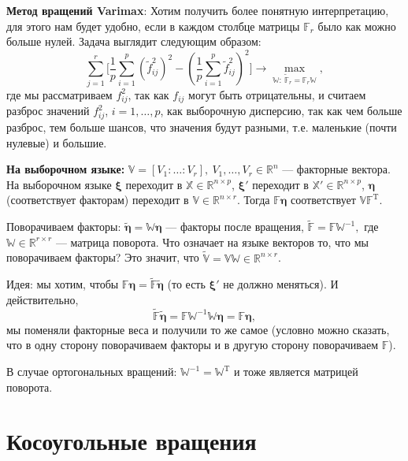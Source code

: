 \documentclass[specialist, 12pt,
subf, %
href, colorlinks=true,
substylefile = spbu.rtx,
]{disser}
\begin{document}
\textbf{Метод вращений Varimax}:
Хотим получить более понятную интерпретацию, для этого нам будет удобно, если в каждом столбце матрицы $\mathbb{F}_r$ было как можно больше нулей. Задача выглядит следующим образом:
\begin{equation*}
\sum\limits_{j=1}^r \big[\frac{1}{p}\sum\limits_{i=1}^p(\widetilde{f}_{ij}^2)^2-(\frac{1}{p}\sum\limits_{i=1}^p\widetilde{f}_{ij}^2)^2\big] \to \max\limits_{\mathbb{W}:~ \widetilde{\mathbb{F}}_r=\mathbb{F}_r\mathbb{W} },
\end{equation*}
где мы рассматриваем $f_{ij}^2$, так как $f_{ij}$ могут быть отрицательны, и считаем разброс значений $f_{ij}^2$, $i=1,\ldots,p$, как выборочную дисперсию, так как чем больше разброс, тем больше шансов, что значения будут разными, т.е. маленькие (почти нулевые) и большие.

\textbf{На выборочном языке:} $\mathbb{V}=[V_1:\ldots:V_r], ~ V_1,\ldots,V_r\in\mathbb{R}^n$ --- факторные вектора. На выборочном языке $\bm\xi$ переходит в $\mathbb{X}\in\mathbb{R}^{n\times p}$, $\bm\xi'$ переходит в $\mathbb{X}'\in\mathbb{R}^{n\times p}$, $\bm\eta$ (соответствует факторам) переходит в $\mathbb{V}\in\mathbb{R}^{n\times r}$. Тогда $\mathbb{F}\bm\eta$ соответствует $\mathbb{V}\mathbb{F}^\mathrm{T}$.

Поворачиваем факторы: $\widetilde{\bm\eta}=\mathbb{W}\bm\eta$ --- факторы после вращения, $\widetilde{\mathbb{F}}=\mathbb{F}\mathbb{W}^{-1},$ где $\mathbb{W}\in\mathbb{R}^{r\times r}$ --- матрица поворота. Что означает на языке векторов то, что мы поворачиваем факторы? Это значит, что $\widetilde{\mathbb{V}}=\mathbb{V}\mathbb{W}\in\mathbb{R}^{n\times r}$.

Идея: мы хотим, чтобы $\mathbb{F}\bm\eta=\widetilde{\mathbb{F}}\widetilde{\bm\eta}$ (то есть $\bm\xi'$ не должно меняться). И действительно,
\begin{equation*}
\widetilde{\mathbb{F}}\widetilde{\bm\eta}=\mathbb{F}\mathbb{W}^{-1}\mathbb{W}\bm\eta=\mathbb{F}\bm\eta,
\end{equation*}
мы поменяли факторные веса и получили то же самое (условно можно сказать, что в одну сторону поворачиваем факторы и в другую сторону поворачиваем $\mathbb{F}$).

В случае ортогональных вращений: $\mathbb{W}^{-1}=\mathbb{W}^{\mathrm{T}}$ и тоже является матрицей поворота.


\section{Косоугольные вращения}
\end{document}
